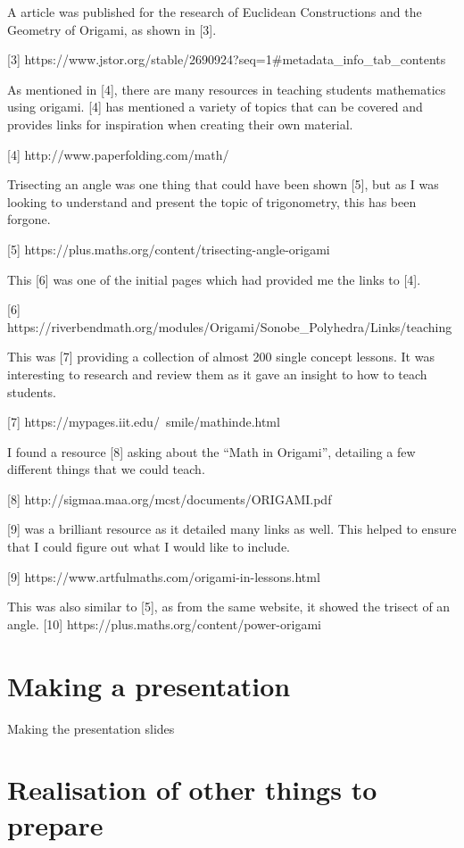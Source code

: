 \documentclass[12pt, a4paper,oneside]{book}
\numberwithin{equation}{section}
\begin{document}
A article was published for the research of Euclidean Constructions and the Geometry of Origami, as shown in [3].

[3] https://www.jstor.org/stable/2690924?seq=1#metadata_info_tab_contents

As mentioned in [4], there are many resources in teaching students mathematics using origami. [4] has mentioned a variety of topics that can be covered and provides links for inspiration when creating their own material.

[4] http://www.paperfolding.com/math/

Trisecting an angle was one thing that could have been shown [5], but as I was looking to understand and present the topic of trigonometry, this has been forgone.

[5] https://plus.maths.org/content/trisecting-angle-origami

This [6] was one of the initial pages which had provided me the links to [4].

[6] https://riverbendmath.org/modules/Origami/Sonobe_Polyhedra/Links/teaching

This was [7] providing a collection of almost 200 single concept lessons. It was interesting to research and review them as it gave an insight to how to teach students.

[7] https://mypages.iit.edu/~smile/mathinde.html

I found a resource [8] asking about the “Math in Origami”, detailing a few different things that we could teach.

[8] http://sigmaa.maa.org/mcst/documents/ORIGAMI.pdf

[9] was a brilliant resource as it detailed many links as well. This helped to ensure that I could figure out what I would like to include.

[9] https://www.artfulmaths.com/origami-in-lessons.html

This was also similar to [5], as from the same website, it showed the trisect of an angle. [10] https://plus.maths.org/content/power-origami

\section{Making a presentation}\label{sec:x.x}

Making the presentation slides

\section{Realisation of other things to prepare}\label{sec:x.x}
\end{document}

